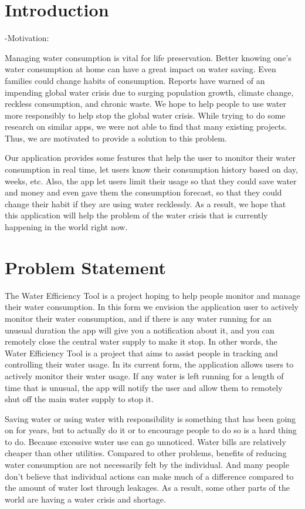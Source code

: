 \documentclass[10pt]{article}
\begin{document}
\section{Introduction}
-Motivation:

Managing water consumption is vital for life preservation. Better knowing one's water consumption at home can have a great impact on water saving. Even families could change habits of consumption. Reports have warned of an impending global water crisis due to surging population growth, climate change, reckless consumption, and chronic waste. We hope to help people to use water more responsibly to help stop the global water crisis. While trying to do some research on similar apps, we were not able to find that many existing projects. Thus, we are motivated to provide a solution to this problem.

Our application provides some features that help the user to monitor their water consumption in real time, let users know their consumption history based on day, weeks, etc. Also, the app let users limit their usage so that they could save water and money and even gave them the consumption forecast, so that they could change their habit if they are using water recklessly. As a result, we hope that this application will help the problem of the water crisis that is currently happening in the world right now.

\section{Problem Statement}
The Water Efficiency Tool is a project hoping to help people monitor and manage their water consumption. In this form we envision the application user to actively monitor their water consumption, and if there is any water running for an unusual duration the app will give you a notification about it, and you can remotely close the central water supply to make it stop. In other words, the Water Efficiency Tool is a project that aims to assist people in tracking and controlling their water usage. In its current form, the application allows users to actively monitor their water usage. If any water is left running for a length of time that is unusual, the app will notify the user and allow them to remotely shut off the main water supply to stop it.

Saving water or using water with responsibility is something that has been going on for years, but to actually do it or to encourage people to do so is a hard thing to do. Because excessive water use can go unnoticed. Water bills are relatively cheaper than other utilities. Compared to other problems, benefits of reducing water consumption are not necessarily felt by the individual. And many people don't believe that individual actions can make much of a difference compared to the amount of water lost through leakages. As a result, some other parts of the world are having a water crisis and shortage.
\end{document}
